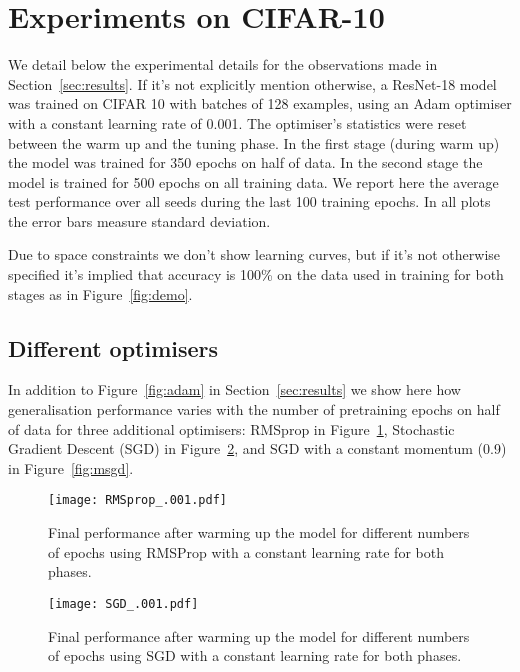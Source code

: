 \appendix
\section{Experiments on CIFAR-10}
\label{sec:cifar}

We detail below the experimental details for the observations made in Section~\ref{sec:results}. If it's not explicitly mention otherwise, a ResNet-18 model was trained on CIFAR 10 with batches of 128 examples, using an Adam optimiser with a constant learning rate of 0.001. The optimiser's statistics were reset between the warm up and the tuning phase. In the first stage (during warm up) the model was trained for 350 epochs on half of data. In the second stage the model is trained for 500 epochs on all training data. We report here the average test performance over all seeds during the last 100 training epochs. In all plots the error bars measure standard deviation.

Due to space constraints we don't show learning curves, but if it's not otherwise specified it's implied that accuracy is 100\% on the data used in training for both stages as in Figure~\ref{fig:demo}.

\subsection{Different optimisers}

In addition to Figure~\ref{fig:adam} in Section~\ref{sec:results} we show here how generalisation performance varies with the number of pretraining epochs on half of data for three additional optimisers: RMSprop in Figure~\ref{fig:rmsprop}, Stochastic Gradient Descent (SGD) in Figure~\ref{fig:sgd}, and SGD with a constant momentum (0.9) in Figure~\ref{fig:msgd}.

\begin{figure}[h!tb]
    \centering%
    \texttt{[image: RMSprop\_.001.pdf]}
    \caption{Final performance after warming up the model for different numbers of epochs using RMSProp with a constant learning rate for both phases.}
    \label{fig:rmsprop}
\end{figure}

\begin{figure}[h!tb]
    \centering%
    \texttt{[image: SGD\_.001.pdf]}
    \caption{Final performance after warming up the model for different numbers of epochs using SGD with a constant learning rate for both phases.}
    \label{fig:sgd}
\end{figure}

